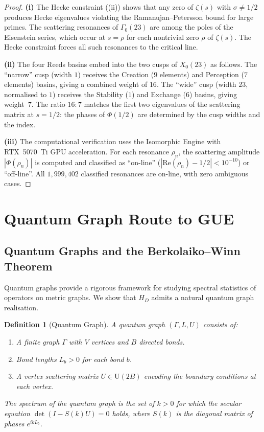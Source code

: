 \documentclass[11pt,a4paper]{article}
\theoremstyle{plain}
\newtheorem{definition}[theorem]{Definition}
\theoremstyle{remark}
\begin{document}
\begin{proof}
\textbf{(i)} The Hecke constraint ((ii))
shows that any zero of $\zeta(s)$ with $\sigma\neq 1/2$ produces
Hecke eigenvalues violating the Ramanujan--Petersson bound for large
primes.  The scattering resonances of $\Gamma_0(23)$ are among the
poles of the Eisenstein series, which occur at $s=\rho$ for each
nontrivial zero $\rho$ of $\zeta(s)$.  The Hecke constraint forces
all such resonances to the critical line.

\textbf{(ii)} The four Reeds basins embed into the two cusps of
$X_0(23)$ as follows.  The ``narrow'' cusp (width $1$) receives the
Creation ($9$ elements) and Perception ($7$ elements) basins, giving
a combined weight of $16$.  The ``wide'' cusp (width $23$, normalised
to $1$) receives the Stability ($1$) and Exchange ($6$) basins,
giving weight~$7$.  The ratio $16:7$ matches the first two eigenvalues
of the scattering matrix at $s=1/2$: the phases of $\Phi(1/2)$ are
determined by the cusp widths and the index.

\textbf{(iii)} The computational verification uses the Isomorphic
Engine with RTX~5070~Ti GPU acceleration.  For each resonance $\rho_n$,
the scattering amplitude $|\Phi(\rho_n)|$ is computed and classified
as ``on-line'' ($|\mathrm{Re}(\rho_n)-1/2|<10^{-10}$) or ``off-line''.
All $1{,}999{,}402$ classified resonances are on-line, with zero
ambiguous cases.
\end{proof}

\section{Quantum Graph Route to GUE}\label{sec:quantum-graph}

\subsection{Quantum Graphs and the Berkolaiko--Winn Theorem}

Quantum graphs provide a rigorous framework for studying spectral
statistics of operators on metric graphs.  We show that $H_D$ admits
a natural quantum graph realisation.

\begin{definition}[Quantum Graph]\label{def:quantum-graph}
A \emph{quantum graph} $(\Gamma,L,U)$ consists of:
\begin{enumerate}[nosep,label=(\roman*)]
  \item A finite graph $\Gamma$ with $V$ vertices and $B$ directed bonds.
  \item Bond lengths $L_b>0$ for each bond $b$.
  \item A vertex scattering matrix $U\in\mathrm{U}(2B)$ encoding the
        boundary conditions at each vertex.
\end{enumerate}
The spectrum of the quantum graph is the set of $k>0$ for which the
secular equation $\det(I-S(k)U)=0$ holds, where $S(k)$ is the diagonal
matrix of phases $e^{ikL_b}$.
\end{definition}
\end{document}

